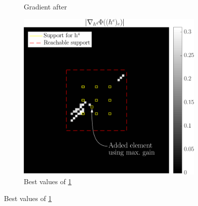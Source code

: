 \begin{figure}[!ht]
\begin{subfigure}[b]{0.34\linewidth}
\caption{Gradient after}\label{fig_beforeafter-aftergainadd-grad}
\end{subfigure}
\begin{subfigure}[b]{0.34\linewidth}\centering
\includegraphics[width=\linewidth]{figures/before_after/gainafter_partgrad4_bestvalues.pdf}
\caption{Best values of \ref{fig_beforeafter-aftergainadd-grad}}\label{fig_beforeafter-aftergainadd-grad_best}
\end{subfigure}
\end{figure}

